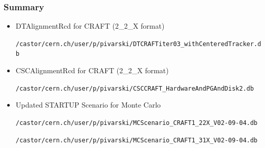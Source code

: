 \documentclass[compress]{beamer}
\begin{document}
\begin{frame}
\frametitle{Summary}
\begin{itemize}\setlength{\itemsep}{0.4 cm}
\item DTAlignmentRcd for CRAFT (2\_2\_X format)

{\tt \scriptsize /castor/cern.ch/user/p/pivarski/DTCRAFTiter03\_withCenteredTracker.db}

\item CSCAlignmentRcd for CRAFT (2\_2\_X format)

{\tt \scriptsize /castor/cern.ch/user/p/pivarski/CSCCRAFT\_HardwareAndPGAndDisk2.db}

\item Updated STARTUP Scenario for Monte Carlo

{\tt \scriptsize /castor/cern.ch/user/p/pivarski/MCScenario\_CRAFT1\_22X\_V02-09-04.db}

{\tt \scriptsize /castor/cern.ch/user/p/pivarski/MCScenario\_CRAFT1\_31X\_V02-09-04.db}

\end{itemize}
\label{numpages}
\end{frame}
\end{document}
